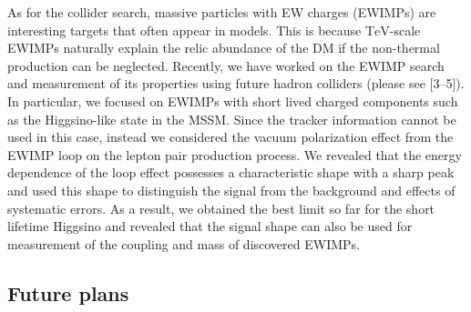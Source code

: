 \documentclass[12pt,notitlepage]{book}
\def\rem#1{ {\bf\textcolor{red}{($\clubsuit$ #1 $\clubsuit$)}}}
\begin{document}
As for the collider search, massive particles with EW charges (EWIMPs) are interesting targets that often appear in models.
This is because $\mathrm{TeV}$-scale EWIMPs naturally explain the relic abundance of the DM if the non-thermal production can be neglected.
Recently, we have worked on the EWIMP search and measurement of its properties using future hadron colliders (please see [3--5]).
In particular, we focused on EWIMPs with short lived charged components such as the Higgsino-like state in the MSSM.
Since the tracker information cannot be used in this case, instead we considered the vacuum polarization effect from the EWIMP loop on the lepton pair production process.
We revealed that the energy dependence of the loop effect possesses a characteristic shape with a sharp peak and used this shape to distinguish the signal from the background and effects of systematic errors.
As a result, we obtained the best limit so far for the short lifetime Higgsino and revealed that the signal shape can also be used for measurement of the coupling and mass of discovered EWIMPs.





\vspace*{-2mm}
\subsection*{Future plans}
\end{document}
